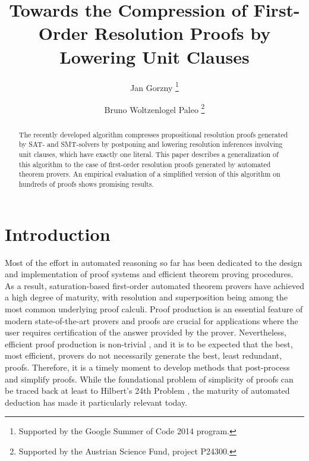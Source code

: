 \documentclass{llncs}
\title{Towards the Compression of First-Order Resolution Proofs by Lowering Unit Clauses}
\author{
  Jan Gorzny\inst{1}
  \thanks{Supported by the Google Summer of Code 2014 program.}
  \and 
  Bruno Woltzenlogel Paleo\inst{2}
  \thanks{Supported by the Austrian Science Fund, project P24300.}
}
\institute{
  University of Victoria, Canada \\
  \email{jgorzny@uvic.ca}
  \and 
  Vienna University of Technology, Austria \\
  \email{bruno@logic.at}
}
\begin{document}
\maketitle


\begin{abstract}
The recently developed {\LowerUnits} algorithm compresses
propositional resolution proofs generated by SAT- and SMT-solvers by postponing and lowering resolution inferences involving unit clauses, which have exactly one literal. This paper describes a generalization of this algorithm to the case of first-order resolution proofs generated by automated theorem provers. An empirical evaluation of a simplified version of this algorithm on hundreds of proofs shows promising results.
\end{abstract}


\setcounter{footnote}{0}

\section{Introduction}

Most of the effort in automated reasoning so far has been dedicated to the design and implementation of proof systems and efficient theorem proving procedures. As a result, saturation-based first-order automated theorem provers have achieved a high degree of maturity, with resolution \cite{Robinson} and superposition \cite{todo} being among the most common underlying proof calculi. Proof production is an essential feature of modern state-of-the-art provers and proofs are crucial for applications where the user requires certification of the answer provided by the prover. Nevertheless, efficient proof production is non-trivial \cite{SchultzAPPA}, and it is to be expected that the best, most efficient, provers do not necessarily generate the best, least redundant, proofs. Therefore, it is a timely moment to develop methods that post-process and simplify proofs. While the foundational problem of simplicity of proofs can be traced back at least to Hilbert's 24th Problem \cite{Hilbert}, the maturity of automated deduction has made it particularly relevant today.  
\end{document}
